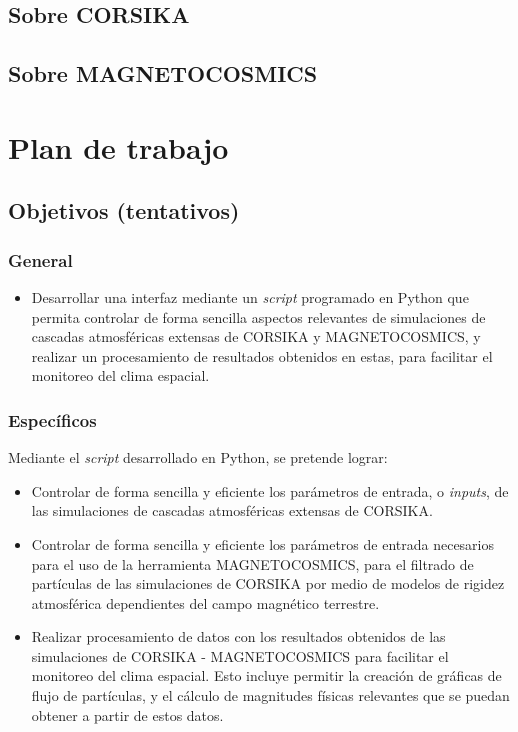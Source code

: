 \documentclass{report}
\begin{document}
\subsection*{Sobre CORSIKA}


\subsection*{Sobre MAGNETOCOSMICS}

\section*{Plan de trabajo}

\subsection*{Objetivos (tentativos)}

\subsubsection*{General}
\begin{itemize}
    \item Desarrollar una interfaz mediante un \textit{script} programado en Python que permita controlar de forma sencilla aspectos relevantes de simulaciones de cascadas atmosféricas extensas de CORSIKA y MAGNETOCOSMICS, y realizar un procesamiento de resultados obtenidos en estas, para facilitar el monitoreo del clima espacial.
\end{itemize}

\subsubsection*{Específicos}
Mediante el \textit{script} desarrollado en Python, se pretende lograr:
\begin{itemize}
    \item Controlar de forma sencilla y eficiente los parámetros de entrada, o \textit{inputs}, de las simulaciones de cascadas atmosféricas extensas de CORSIKA.
    \item Controlar de forma sencilla y eficiente los parámetros de entrada necesarios para el uso de la herramienta MAGNETOCOSMICS, para el filtrado de partículas de las simulaciones de CORSIKA por medio de modelos de rigidez atmosférica dependientes del campo magnético terrestre.
    \item Realizar procesamiento de datos con los resultados obtenidos de las simulaciones de CORSIKA - MAGNETOCOSMICS para facilitar el monitoreo del clima espacial. Esto incluye permitir la creación de gráficas de flujo de partículas, y el cálculo de magnitudes físicas relevantes que se puedan obtener a partir de estos datos.
\end{itemize}
\end{document}
